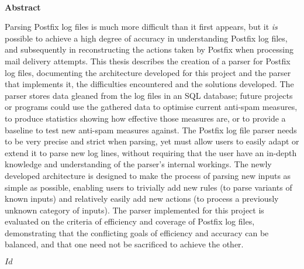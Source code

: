 \documentclass[a4paper,12pt,draft]{report}
\newcommand{\specialpage}[1]{%
    \phantomsection{}
    \addcontentsline{toc}{chapter}{#1}%
}
\newcommand{\titleandauthor}[0]{%
\begin{center}

    {\Huge Parsing Postfix Log Files}

    \vfill{}

    {\LARGE John Tobin}

    \vfill{}

\end{center}
}
\begin{document}
\newpage{}

\specialpage{Abstract}

~\empty{}

\vfill{}
\vfill{}
\vfill{}


\begin{center}
    \textbf{Abstract}
\end{center}

Parsing Postfix log files is much more difficult than it first appears, but
it \textit{is\/} possible to achieve a high degree of accuracy in
understanding Postfix log files, and subsequently in reconstructing the
actions taken by Postfix when processing mail delivery attempts.  This
thesis describes the creation of a parser for Postfix log files,
documenting the architecture developed for this project and the parser that
implements it, the difficulties encountered and the solutions developed.
The parser stores data gleaned from the log files in an SQL database;
future projects or programs could use the gathered data to optimise current
anti-spam measures, to produce statistics showing how effective those
measures are, or to provide a baseline to test new anti-spam measures
against.  The Postfix log file parser needs to be very precise and strict
when parsing, yet must allow users to easily adapt or extend it to parse
new log lines, without requiring that the user have an in-depth knowledge
and understanding of the parser's internal workings.  The newly developed
architecture is designed to make the process of parsing new inputs as
simple as possible, enabling users to trivially add new rules (to parse
variants of known inputs) and relatively easily add new actions (to process
a previously unknown category of inputs).  The parser implemented for this
project is evaluated on the criteria of efficiency and coverage of Postfix
log files, demonstrating that the conflicting goals of efficiency and
accuracy can be balanced, and that one need not be sacrificed to achieve
the other.

\SVN$Id$

\vfill{}
\vfill{}
\vfill{}

~\empty{}

\newpage{}

\pagestyle{headings}




\glsaddall[types={postfix}]
\end{document}
